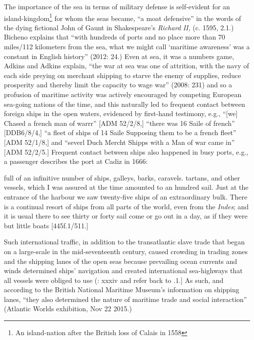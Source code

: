 The importance of the sea in terms of military defense is self-evident for an island-kingdom\footnote{An island-nation after the British loss of Calais in 1558} for whom the seas became, “a moat defensive” in the words of the dying fictional John of Gaunt in Shakespeare’s \textit{Richard} \textit{II,} (c. 1595, 2.1.) Bicheno explains that “with hundreds of ports and no place more than 70 miles/112 kilometers from the sea, what we might call ‘maritime awareness’ was a constant in English history” (2012: 24.) Even at sea, it was a numbers game, Adkins and Adkins explain, “the war at sea was one of attrition, with the navy of each side preying on merchant shipping to starve the enemy of supplies, reduce prosperity and thereby limit the capacity to wage war” (2008: 231) and so a profusion of maritime activity was actively encouraged by competing European sea-going nations of the time, and this naturally led to frequent contact between foreign ships in the open waters, evidenced by first-hand testimony, e.g., “[we] Chased a french man of warrr” [ADM 52/2/8,] “there was 16 Saile of french” [DDB6/8/4,] “a fleet of ships of 14 Saile Supposing them to be a french fleet” [ADM 52/1/8,] and “severl Duch Mercht Shipps with a Man of war came in” [ADM 52/2/5.] Frequent contact between ships also happened in busy ports, e.g., a passenger describes the port at Cadiz in 1666:

full of an infinitive number of ships, galleys, barks, caravels. tartans, and other vessels, which I was assured at the time amounted to an hundred sail. Just at the entrance of the harbour we saw twenty-five ships of an extraordinary bulk. There is a continual resort of ships from all parts of the world, even from the \textit{Indes}; and it is usual there to see thirty or forty sail come or go out in a day, as if they were but little boats [445f.1/511.] 

Such international traffic, in addition to the transatlantic slave trade that began on a large-scale in the mid-seventeenth century, caused crowding in trading zones and the shipping lanes of the open seas because prevailing ocean currents and winds determined ships’ navigation and created international sea-highways that all vessels were obliged to use (\citealt{AdkinsAdkins2008}: xxxiv and refer back to .1.] As such, and according to the British National Maritime Museum’s information on shipping lanes, “they also determined the nature of maritime trade and social interaction” (Atlantic Worlds exhibition, Nov 22 2015.)  

